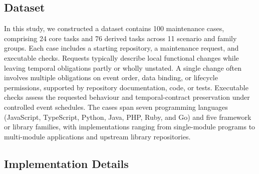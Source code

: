 \subsection{Dataset}


In this study, we constructed a dataset contains 100 maintenance cases, comprising 24 core tasks and
76 derived tasks across 11 scenario and family groups. Each case includes a starting
repository, a maintenance request, and executable checks. Requests typically
describe local functional changes while leaving temporal obligations partly
or wholly unstated. A single change often involves multiple obligations on
event order, data binding, or lifecycle permissions, supported by repository
documentation, code, or tests. Executable checks assess the requested behaviour
and temporal-contract preservation under controlled event schedules. The cases
span seven programming languages (JavaScript, TypeScript, Python, Java, PHP,
Ruby, and Go) and five framework or library families, with implementations
ranging from single-module programs to multi-module applications and upstream
library repositories.



\subsection{Implementation Details}


